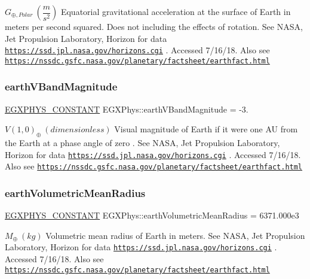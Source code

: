 $ G_{\oplus,Polar} \ (\dfrac{m}{s^2})$ Equatorial gravitational acceleration at the surface of Earth in meters per second squared. Does not including the effects of rotation. See N\+A\+SA, Jet Propulsion Laboratory, Horizon for data \href{https://ssd.jpl.nasa.gov/horizons.cgi}{\tt https\+://ssd.\+jpl.\+nasa.\+gov/horizons.\+cgi} . Accessed 7/16/18. Also see \href{https://nssdc.gsfc.nasa.gov/planetary/factsheet/earthfact.html}{\tt https\+://nssdc.\+gsfc.\+nasa.\+gov/planetary/factsheet/earthfact.\+html} \mbox{\label{group___e_g_x_phys-_constants-_astrophysics-_solar_system-_earth-_bulk_ga184e55af75c87cafba30c63d054cb189}} 
\subsubsection{\texorpdfstring{earth\+V\+Band\+Magnitude}{earthVBandMagnitude}}
{\footnotesize\ttfamily \mbox{\hyperlink{group___e_g_x_phys-_constants-_macros_ga76980d288494ce1714c9ac68a95ba702}{E\+G\+X\+P\+H\+Y\+S\+\_\+\+C\+O\+N\+S\+T\+A\+NT}} E\+G\+X\+Phys\+::earth\+V\+Band\+Magnitude = -\/3.}

$ V(1,0)_{\oplus} \ (dimensionless)$ Visual magnitude of Earth if it were one AU from the Earth at a phase angle of zero . See N\+A\+SA, Jet Propulsion Laboratory, Horizon for data \href{https://ssd.jpl.nasa.gov/horizons.cgi}{\tt https\+://ssd.\+jpl.\+nasa.\+gov/horizons.\+cgi} . Accessed 7/16/18. Also see \href{https://nssdc.gsfc.nasa.gov/planetary/factsheet/earthfact.html}{\tt https\+://nssdc.\+gsfc.\+nasa.\+gov/planetary/factsheet/earthfact.\+html} \mbox{\label{group___e_g_x_phys-_constants-_astrophysics-_solar_system-_earth-_bulk_ga403e9a295cb108232c7a041dde01d02b}} 
\subsubsection{\texorpdfstring{earth\+Volumetric\+Mean\+Radius}{earthVolumetricMeanRadius}}
{\footnotesize\ttfamily \mbox{\hyperlink{group___e_g_x_phys-_constants-_macros_ga76980d288494ce1714c9ac68a95ba702}{E\+G\+X\+P\+H\+Y\+S\+\_\+\+C\+O\+N\+S\+T\+A\+NT}} E\+G\+X\+Phys\+::earth\+Volumetric\+Mean\+Radius = 6371.\+000e3}

$M_{\oplus} \ (kg)$ Volumetric mean radius of Earth in meters. See N\+A\+SA, Jet Propulsion Laboratory, Horizon for data \href{https://ssd.jpl.nasa.gov/horizons.cgi}{\tt https\+://ssd.\+jpl.\+nasa.\+gov/horizons.\+cgi} . Accessed 7/16/18. Also see \href{https://nssdc.gsfc.nasa.gov/planetary/factsheet/earthfact.html}{\tt https\+://nssdc.\+gsfc.\+nasa.\+gov/planetary/factsheet/earthfact.\+html} 